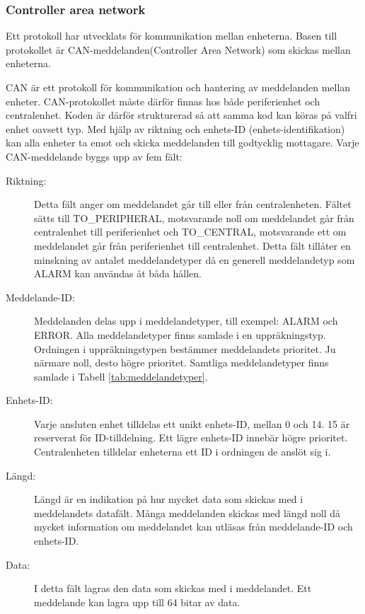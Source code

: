 \documentclass[a4paper]{article}
\begin{document}
\subsubsection{Controller area network}
Ett protokoll har utvecklats för kommunikation mellan enheterna.
Basen till protokollet är CAN-meddelanden(Controller Area Network) som skickas mellan enheterna.

CAN är ett protokoll för kommunikation och hantering av meddelanden mellan enheter.
CAN-protokollet måste därför finnas hos både periferienhet och centralenhet.
Koden är därför strukturerad så att samma kod kan köras på valfri enhet oavsett typ.
Med hjälp av riktning och enhets-ID (enhets-identifikation) kan alla enheter ta emot och skicka meddelanden till godtycklig mottagare.
Varje CAN-meddelande byggs upp av fem fält:

\begin{description}
    \item[Riktning:] Detta fält anger om meddelandet går till eller från centralenheten.
    Fältet sätts till TO\_PERIPHERAL, motsvarande noll om meddelandet går från centralenhet till periferienhet och TO\_CENTRAL, motsvarande ett om meddelandet går från periferienhet till centralenhet.
    Detta fält tillåter en minskning av antalet meddelandetyper då en generell meddelandetyp som ALARM kan användas åt båda hållen.

    \item[Meddelande-ID:] Meddelanden delas upp i meddelandetyper, till exempel: ALARM och ERROR.
    Alla meddelandetyper finns samlade i en uppräkningstyp.
    Ordningen i uppräkningstypen bestämmer meddelandets prioritet.
    Ju närmare noll, desto högre prioritet.
    Samtliga meddelandetyper finns samlade i Tabell \ref{tab:meddelandetyper}.

    \item[Enhets-ID:] Varje ansluten enhet tilldelas ett unikt enhets-ID, mellan 0 och 14.
    15 är reserverat för ID-tilldelning. Ett lägre enhets-ID innebär högre prioritet.
    Centralenheten tilldelar enheterna ett ID i ordningen de anslöt sig i.

    \item[Längd:] Längd är en indikation på hur mycket data som skickas med i meddelandets datafält.
    Många meddelanden skickas med längd noll då mycket information om meddelandet kan utläsas från meddelande-ID och enhets-ID.

    \item[Data:] I detta fält lagras den data som skickas med i meddelandet.
    Ett meddelande kan lagra upp till 64 bitar av data.
\end{description}
\end{document}
